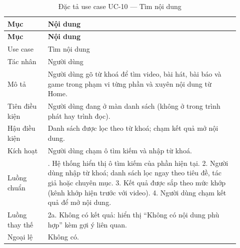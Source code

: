 \begingroup\small\renewcommand{\arraystretch}{1.15}\setlength{\tabcolsep}{3pt}
\begin{longtable}{>{\RaggedRight\arraybackslash}p{0.16\linewidth}>{\RaggedRight\arraybackslash}p{0.76\linewidth}}
\caption{Đặc tả use case UC-10 --- Tìm nội dung}
\label{tab:spec-uc-10}\\
\toprule
\textbf{Mục} & \textbf{Nội dung} \\
\midrule
\endfirsthead
\toprule
\textbf{Mục} & \textbf{Nội dung} \\
\midrule
\endhead
\bottomrule
\endfoot
Use case & Tìm nội dung \\
Tác nhân & Người dùng \\
Mô tả & Người dùng gõ từ khoá để tìm video, bài hát, bài báo và game trong phạm vi từng phần và xuyên nội dung từ Home. \\
Tiên điều kiện & Người dùng đang ở màn danh sách (không ở trong trình phát hay trình đọc). \\
Hậu điều kiện & Danh sách được lọc theo từ khoá; chạm kết quả mở nội dung. \\
Kích hoạt & Người dùng chạm ô tìm kiếm và nhập từ khoá. \\
Luồng chuẩn & 1. Hệ thống hiển thị ô tìm kiếm của phần hiện tại. 2. Người dùng nhập từ khoá; danh sách lọc ngay theo tiêu đề, tác giả hoặc chuyên mục. 3. Kết quả được sắp theo mức khớp (kênh khớp hiện trước với video). 4. Người dùng chạm kết quả để mở nội dung. \\
Luồng thay thế & 2a. Không có kết quả: hiển thị “Không có nội dung phù hợp” kèm gợi ý liên quan. \\
Ngoại lệ & Không có. \\
\end{longtable}
\endgroup

